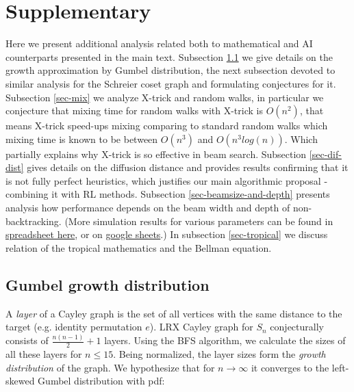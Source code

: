 \documentclass[reqno,11pt]{amsart}
\begin{document}
\section{Supplementary}

Here we present additional analysis related both to mathematical and AI counterparts presented in the main text.
Subsection \ref{growth} we give details on the growth approximation by Gumbel distribution, the next subsection devoted to similar analysis
for the Schreier coset graph and formulating conjectures for it.
Subsection \ref{sec-mix} we analyze X-trick and random walks, in particular we conjecture that mixing time for random walks with X-trick is $O(n^2)$,
that means X-trick speed-ups mixing comparing to standard random walks which mixing time is known to be between $O(n^3)$ and $ O(n^3log(n))$. 
Which partially explains why X-trick is so effective in beam search.
Subsection \ref{sec-dif-dist} gives details on the diffusion distance and provides results confirming that it is not fully perfect heuristics, which justifies our main algorithmic proposal - combining it with RL methods.
Subsection \ref{sec-beamsize-and-depth} presents analysis how performance depends on the beam width and depth of non-backtracking. 
(More simulation results for various parameters can be found in \href{https://www.kaggle.com/competitions/lrx-oeis-a-186783-brainstorm-math-conjecture/discussion/612338}{spreadsheet here}, or  on \href{https://docs.google.com/spreadsheets/d/1KFYTqPDSdH8_vdvWz3YLTLKg5IlW1Kkx_9kJClSKGOs/edit?usp=sharing}{google sheets}.)
In subsection \ref{sec-tropical} we discuss relation of the tropical mathematics and the Bellman equation.  

\subsection{Gumbel growth distribution}
\label{growth}

A \textit{layer} of a Cayley graph is the set of all vertices with the same distance to the target (e.g. identity permutation $e$). LRX Cayley graph for $S_n$ conjecturally consists of $\frac{n(n-1)}2 + 1$ layers. Using the BFS algorithm, we calculate the sizes of all these layers for $n\le 15$. Being normalized, the layer sizes form the \textit{growth distribution} of the graph. We hypothesize that for $n \to \infty$ it converges to the left-skewed Gumbel distribution with pdf:
\end{document}
